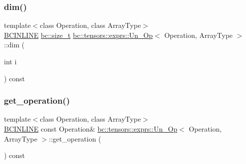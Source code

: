 \mbox{\label{structbc_1_1tensors_1_1exprs_1_1Un__Op_a64c7d1f17a79e63e6fdd06be416c21c8}} 
\subsubsection{\texorpdfstring{dim()}{dim()}}
{\footnotesize\ttfamily template$<$class Operation, class Array\+Type$>$ \\
\hyperlink{common_8h_a6699e8b0449da5c0fafb878e59c1d4b1}{B\+C\+I\+N\+L\+I\+NE} \hyperlink{namespacebc_aaf8e3fbf99b04b1b57c4f80c6f55d3c5}{bc\+::size\+\_\+t} \hyperlink{structbc_1_1tensors_1_1exprs_1_1Un__Op}{bc\+::tensors\+::exprs\+::\+Un\+\_\+\+Op}$<$ Operation, Array\+Type $>$\+::dim (\begin{DoxyParamCaption}\item[{int}]{i }\end{DoxyParamCaption}) const\hspace{0.3cm}{\ttfamily [inline]}}

\mbox{\label{structbc_1_1tensors_1_1exprs_1_1Un__Op_a756b6657d522f931f4379c62e3d4b523}} 
\subsubsection{\texorpdfstring{get\+\_\+operation()}{get\_operation()}}
{\footnotesize\ttfamily template$<$class Operation, class Array\+Type$>$ \\
\hyperlink{common_8h_a6699e8b0449da5c0fafb878e59c1d4b1}{B\+C\+I\+N\+L\+I\+NE} const Operation\& \hyperlink{structbc_1_1tensors_1_1exprs_1_1Un__Op}{bc\+::tensors\+::exprs\+::\+Un\+\_\+\+Op}$<$ Operation, Array\+Type $>$\+::get\+\_\+operation (\begin{DoxyParamCaption}{ }\end{DoxyParamCaption}) const\hspace{0.3cm}{\ttfamily [inline]}}

\mbox{\label{structbc_1_1tensors_1_1exprs_1_1Un__Op_a2996b6b2e5f266f7323fe43b524c9a64}} 
